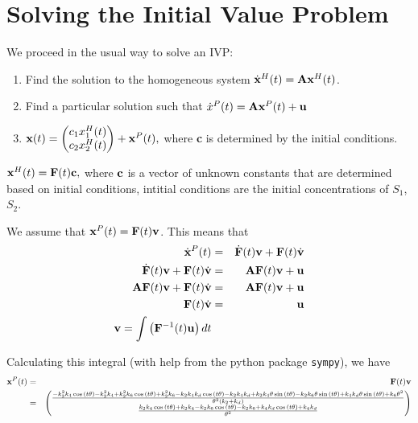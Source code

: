 \documentclass[11pt]{article}
\begin{document}
\section{Solving the Initial Value Problem}
We proceed in the usual way to solve an IVP:
\begin{enumerate}
\item Find the
solution to the homogeneous system
$\dot{\bf x}^H (t) = {\bf A} {\bf x}^H (t)$.
\item
Find a particular solution such that
$\dot{x}^P (t) = {\bf A} {\bf x}^P (t) + {\bf u}$
\item
${\bf x} (t) = 
\begin{pmatrix}
c_1 x_1^H (t) \\
c_2 x_2^H (t) \\
\end{pmatrix}
 + {\bf x}^P (t),$
 where
{\bf c} is determined by the initial conditions.
\end{enumerate}

${\bf x}^H (t) = {\bf F} (t) {\bf c},$ where ${\bf c}$ is a vector
of unknown constants that are determined based on initial conditions,
intitial conditions are the initial concentrations of
$S_1$, $S_2$.

We assume that ${\bf x}^P (t) = {\bf F}(t) {\bf v}$. This means that
\begin{eqnarray*}
\dot{\bf x}^P (t) &= & \dot{\bf F} (t) {\bf v} + {\bf F} (t) \dot{\bf v} \\
\dot{\bf F} (t) {\bf v} + {\bf F} (t) \dot{\bf v} & = & {\bf A} {\bf F}(t) {\bf v} + {\bf u} \\
{\bf A} {\bf F} (t){\bf v} + {\bf F} (t) \dot{\bf v} & = & {\bf A} {\bf F} (t) {\bf v} + {\bf u} \\
{\bf F} (t) \dot{\bf v} & = & {\bf u} \\
{\bf v} = \int \left( {\bf F}^{-1} (t) {\bf u} \right)dt
\end{eqnarray*}

Calculating this integral (with help from the python package
{\tt sympy}), we have
\begin{eqnarray*}
{\bf x}^P (t) & = & {\bf F} (t) {\bf v} \\
& = & \begin{pmatrix}\frac{- k_{2}^{2} k_{4} \cos{\left(t \theta \right)} - k_{2}^{2} k_{4} + k_{2}^{2} k_{6} \cos{\left(t \theta \right)} + k_{2}^{2} k_{6} - k_{2} k_{4} k_{d} \cos{\left(t \theta \right)} - k_{2} k_{4} k_{d} + k_{2} k_{4} \theta \sin{\left(t \theta \right)} - k_{2} k_{6} \theta \sin{\left(t \theta \right)} + k_{4} k_{d} \theta \sin{\left(t \theta \right)} + k_{6} \theta^{2}}{\theta^{2} \left(k_{2} + k_{d}\right)}\\\frac{k_{2} k_{4} \cos{\left(t \theta \right)} + k_{2} k_{4} - k_{2} k_{6} \cos{\left(t \theta \right)} - k_{2} k_{6} + k_{4} k_{d} \cos{\left(t \theta \right)} + k_{4} k_{d}}{\theta^{2}}\end{pmatrix}
\end{eqnarray*}
\end{document}
